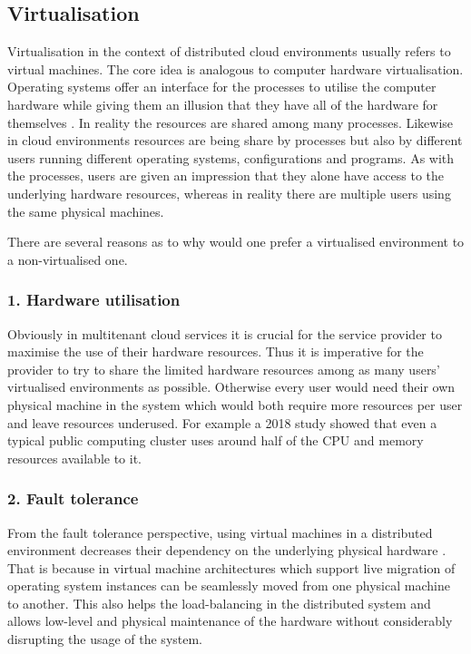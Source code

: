 \subsection{Virtualisation}

Virtualisation in the context of distributed cloud environments usually refers to virtual machines. The core idea is analogous to computer hardware virtualisation. Operating systems offer an interface for the processes to utilise the computer hardware while giving them an illusion that they have all of the hardware for themselves \cite{ArpaciDusseau14-Book}. In reality the resources are shared among many processes. Likewise in cloud environments resources are being share by processes but also by different users running different operating systems, configurations and programs. As with the processes, users are given an impression that they alone have access to the underlying hardware resources, whereas in reality there are multiple users using the same physical machines.

There are several reasons as to why would one prefer a virtualised environment to a non-virtualised one.

\subsubsection*{1. Hardware utilisation} 
Obviously in multitenant cloud services it is crucial for the service provider to maximise the use of their hardware resources. Thus it is imperative for the provider to try to share the limited hardware resources among as many users' virtualised environments as possible. Otherwise every user would need their own physical machine in the system which would both require more resources per user and leave resources underused. For example a 2018 study showed that even a typical public computing cluster uses around half of the CPU and memory resources available to it. \cite{legoos}

\subsubsection*{2. Fault tolerance}
 From the fault tolerance perspective, using virtual machines in a distributed environment decreases their dependency on the underlying physical hardware \cite{Clark05livemigration}. That is because in virtual machine architectures which support live migration of operating system instances can be seamlessly moved from one physical machine to another. This also helps the load-balancing in the distributed system and allows low-level and physical maintenance of the hardware without considerably disrupting the usage of the system. 


